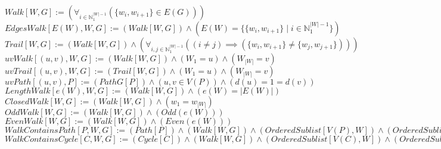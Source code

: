 \documentclass{book}
\newcommand{\abr}{:=}
\newcommand{\pr}[1]{\left(#1\right)}
\newcommand{\st}{\mathbin{|}}
\newcommand{\utup}[1]{\{#1\}}
\begin{document}
$Walk[W, G] \abr \pr{\forall_{i \in \mathbb{N}_1^{|W| - 1}}\pr{\utup{w_i, w_{i + 1}} \in E(G)}}$ \\
$EdgesWalk[E(W), W, G] \abr (Walk[W, G]) \land \pr{E(W) = \{\utup{w_i, w_{i + 1}} \st i \in \mathbb{N}_1^{|W| - 1} \}}$ \\
$Trail[W, G] \abr (Walk[W, G]) \land \pr{\forall_{i, j \in \mathbb{N}_1^{|W| - 1}}\pr{(i \neq j) \implies (\utup{w_i, w_{i + 1}} \neq \utup{w_j, w_{j + 1}})}}$ \\
$uvWalk[(u, v), W, G] \abr (Walk[W, G]) \land (W_1 = u) \land (W_{|W|} = v)$ \\
$uvTrail[(u, v), W, G] \abr (Trail[W, G]) \land (W_1 = u) \land (W_{|W|} = v)$ \\
$uvPath[(u, v), P] \abr (PathG[P]) \land \pr{u, v \in V(P)} \land \pr{d(u) = 1 = d(v)}$ \\
$LengthWalk[e(W), W, G] \abr (Walk[W, G]) \land \pr{e(W) = |E(W)|}$ \\
$ClosedWalk[W, G] \abr (Walk[W, G]) \land (w_1 = w_{|W|})$ \\
$OddWalk[W, G] \abr (Walk[W, G]) \land \pr{Odd\pr{e(W)}}$ \\
$EvenWalk[W, G] \abr (Walk[W, G]) \land \pr{Even\pr{e(W)}}$ \\
$WalkContainsPath[P, W, G] \abr (Path[P]) \land (Walk[W, G]) \land \pr{OrderedSublist[V(P), W]} \land \pr{OrderedSublist[E(P), E(W)]}$ \\
$WalkContainsCycle[C, W, G] \abr (Cycle[C]) \land (Walk[W, G]) \land \pr{OrderedSublist[V(C), W]} \land \pr{OrderedSublist[E(C), E(W)]}$ \\
\end{document}
